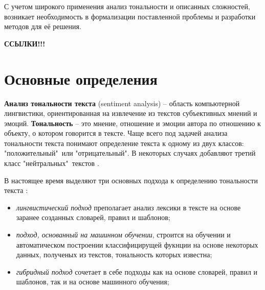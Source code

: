 С учетом широкого применения анализ тональности и описанных сложностей,
возникает необходимость в формализации поставленной проблемы и разработки
методов для её решения.

\textbf{ССЫЛКИ!!!}

\section{Основные определения}

\textbf{Анализ тональности текста} (sentiment analysis) -- область компьютерной
лингвистики, ориентированная на извлечение из текстов субъективных мнений и
эмоций. \textbf{Тональность} -- это мнение, отношение и эмоции автора по
отношению к объекту, о котором говорится в тексте.  Чаще всего под задачей
анализа тональности текста понимают определение текста к одному из двух классов:
"положительный"\ или "отрицательный". В некоторых случаях добавляют третий класс
"нейтральных"\ текстов \cite{article9}.

В настоящее время выделяют три основных подхода к определению тональности
текста \cite{article9}:
\begin{itemize}
    \item \textit{лингвистический подход} преполагает анализ лексики в тексте на
        основе заранее созданных словарей, правил и шаблонов;

    \item \textit{подход, основанный на машинном обучении}, строится на обучении и
        автоматическом построении классифицирущей фукнции на основе
        некоторых данных, полученых из текстов, тональность которых
        известна;

    \item \textit{гибридный подход} сочетает в себе подходы как на основе
        словарей, правил и шаблонов, так и на основе машинного обучения;
\end{itemize}

